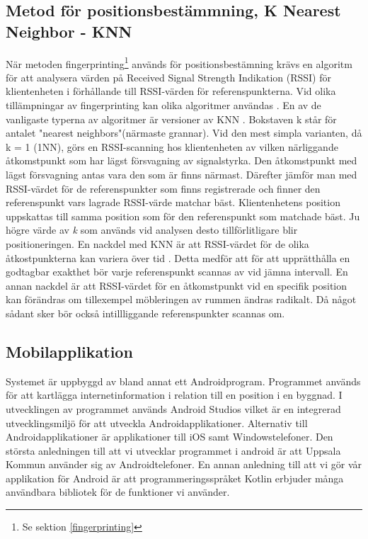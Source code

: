 \documentclass[swedish, a4paper,12pt]{article}
\begin{document}
\subsection{Metod för positionsbestämmning, K Nearest Neighbor - KNN}\label{KNN}
När metoden fingerprinting\footnote{Se sektion \ref{fingerprinting}} används för positionsbestämning krävs en algoritm för att analysera värden på Received Signal Strength Indikation (RSSI) för klientenheten i förhållande till RSSI-värden för referenspunkterna. Vid olika tillämpningar av fingerprinting kan olika algoritmer användas \cite{tian2013fingerprint}\cite{jun2018low}. En av de vanligaste typerna av algoritmer är versioner av KNN \cite{tian2013fingerprint}.
Bokstaven k står för antalet "nearest neighbors"(närmaste grannar). Vid den mest simpla varianten, då k = 1 (1NN), görs en RSSI-scanning hos klientenheten av vilken närliggande åtkomstpunkt som har lägst försvagning av signalstyrka. Den åtkomstpunkt med lägst försvagning antas vara den som är finns närmast. Därefter jämför man med RSSI-värdet för de referenspunkter som finns registrerade och finner den referenspunkt vars lagrade RSSI-värde matchar bäst. Klientenhetens position uppskattas till samma position som för den referenspunkt som matchade bäst.
Ju högre värde av \textit{k} som används vid analysen desto tillförlitligare blir positioneringen.\cite{yiu2017wireless}
En nackdel med KNN är att RSSI-värdet för de olika åtkostpunkterna kan variera över tid \cite{tian2013fingerprint}. Detta medför att för att upprätthålla en godtagbar exakthet bör varje referenspunkt scannas av vid jämna intervall.
En annan nackdel är att RSSI-värdet för en åtkomstpunkt vid en specifik position kan förändras om tillexempel möbleringen av rummen ändras radikalt. Då något sådant sker bör också intillliggande referenspunkter scannas om.

\subsection{Mobilapplikation}
Systemet är uppbyggd av bland annat ett Androidprogram. Programmet används för att kartlägga internetinformation i relation till en position i en byggnad. I utvecklingen av programmet används Android Studios vilket är en integrerad utvecklingsmiljö för att utveckla Androidapplikationer. Alternativ till Androidapplikationer är applikationer till iOS samt Windowstelefoner. Den största anledningen till att vi utvecklar programmet i android är att Uppsala Kommun använder sig av Androidtelefoner. En annan anledning till att vi gör vår applikation för Android är att programmeringsspråket Kotlin erbjuder många användbara bibliotek för de funktioner vi använder.
\end{document}
